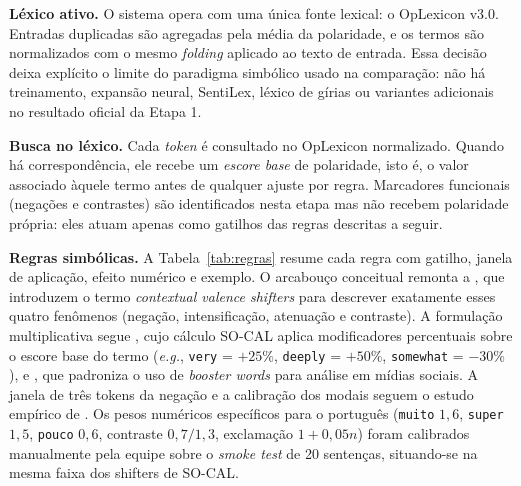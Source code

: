 \documentclass[11pt,a4paper]{article}
\begin{document}
\textbf{Léxico ativo.}
O sistema opera com uma única fonte lexical: o OpLexicon v3.0. Entradas duplicadas são agregadas pela média da polaridade, e os termos são normalizados com o mesmo \emph{folding} aplicado ao texto de entrada. Essa decisão deixa explícito o limite do paradigma simbólico usado na comparação: não há treinamento, expansão neural, SentiLex, léxico de gírias ou variantes adicionais no resultado oficial da Etapa 1.

\textbf{Busca no léxico.}
Cada \emph{token} é consultado no OpLexicon normalizado. Quando há correspondência, ele recebe um \emph{escore base} de polaridade, isto é, o valor associado àquele termo antes de qualquer ajuste por regra. Marcadores funcionais (negações e contrastes) são identificados nesta etapa mas não recebem polaridade própria: eles atuam apenas como gatilhos das regras descritas a seguir.

\textbf{Regras simbólicas.}
A Tabela~\ref{tab:regras} resume cada regra com gatilho, janela de aplicação, efeito numérico e exemplo. O arcabouço conceitual remonta a \citet{polanyi2006valenceshifters}, que introduzem o termo \emph{contextual valence shifters} para descrever exatamente esses quatro fenômenos (negação, intensificação, atenuação e contraste). A formulação multiplicativa segue \citet{taboada2011lexicon}, cujo cálculo SO-CAL aplica modificadores percentuais sobre o escore base do termo (\textit{e.g.}, \texttt{very} = $+25\%$, \texttt{deeply} = $+50\%$, \texttt{somewhat} = $-30\%$), e \citet{hutto2014vader}, que padroniza o uso de \emph{booster words} para análise em mídias sociais. A janela de três tokens da negação e a calibração dos modais seguem o estudo empírico de \citet{kiritchenko2016effect}. Os pesos numéricos específicos para o português (\texttt{muito} $1{,}6$, \texttt{super} $1{,}5$, \texttt{pouco} $0{,}6$, contraste $0{,}7/1{,}3$, exclamação $1+0{,}05n$) foram calibrados manualmente pela equipe sobre o \emph{smoke test} de 20 sentenças, situando-se na mesma faixa dos shifters de SO-CAL.
\end{document}
